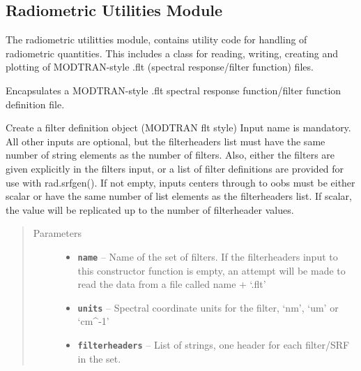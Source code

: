\documentclass[a4paper,10pt,english]{sphinxmanual}
\begin{document}
\subsection{Radiometric Utilities Module}
\label{packages:radiometric-utilities-module}
The radiometric utilitties module,  contains utility code for handling of radiometric quantities. This
includes a class  for reading, writing, creating and plotting of MODTRAN-style .flt (spectral response/filter
function) files.
\label{packages:module-radute}

\begin{fulllineitems}
\label{packages:radute.Flt}
Encapsulates a MODTRAN-style .flt spectral response function/filter function definition file.

Create a filter definition object (MODTRAN flt style)
Input name is mandatory. All other inputs are optional, but the filterheaders list must have the same number of
string elements as the number of filters. Also, either the filters are given explicitly in the filters input, or
a list of filter definitions are provided for use with rad.srfgen().
If not empty, inputs centers through to oobs must be either scalar or have the same number of list elements as
the filterheaders list. If scalar, the value will be replicated up to the number of filterheader values.
\begin{quote}\begin{description}
\item[{Parameters}] \leavevmode\begin{itemize}
\item {} 
\textbf{\texttt{name}} -- Name of the set of filters. If the filterheaders input to this constructor function
is empty, an attempt will be made to read the data from a file called name + `.flt'

\item {} 
\textbf{\texttt{units}} -- Spectral coordinate units for the filter, `nm', `um' or `cm\textasciicircum{}-1'

\item {} 
\textbf{\texttt{filterheaders}} -- List of strings, one header for each filter/SRF in the set.


\end{itemize}
\end{description}
\end{quote}
\end{fulllineitems}
\end{document}
